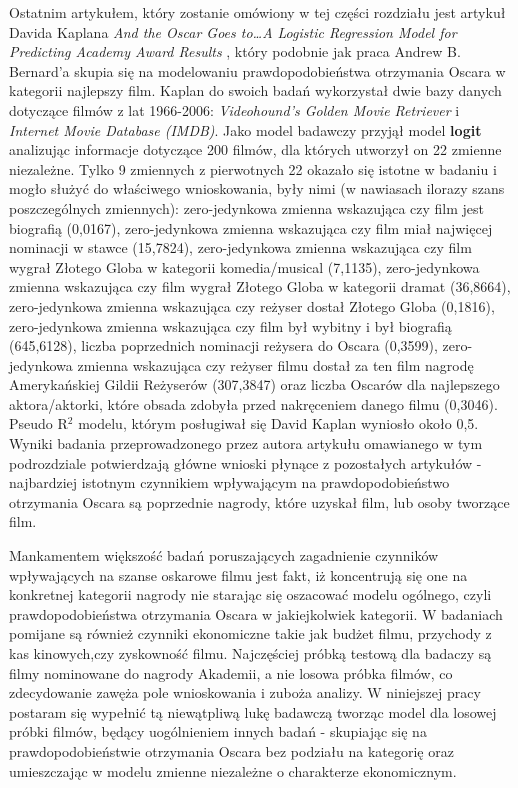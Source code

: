 Ostatnim artykułem, który zostanie omówiony w tej części rozdziału jest artykuł Davida Kaplana \textit{And the Oscar Goes to…A Logistic Regression Model for Predicting Academy Award Results} \cite{kaplan06}, który podobnie jak praca Andrew B. Bernard'a skupia się na modelowaniu prawdopodobieństwa otrzymania Oscara w kategorii najlepszy film. Kaplan do swoich badań wykorzystał dwie bazy danych dotyczące filmów z lat 1966-2006: \textit{Videohound’s Golden Movie Retriever} i \textit{Internet Movie Database (IMDB)}. Jako model badawczy przyjął model \textbf{logit} analizując informacje dotyczące 200 filmów, dla których utworzył on 22 zmienne niezależne. Tylko 9 zmiennych z pierwotnych 22 okazało się istotne w badaniu i mogło służyć do właściwego wnioskowania, były nimi (w nawiasach ilorazy szans poszczególnych zmiennych): zero-jedynkowa zmienna wskazująca czy film jest biografią (0,0167), zero-jedynkowa zmienna wskazująca czy film miał najwięcej nominacji w stawce (15,7824), zero-jedynkowa zmienna wskazująca czy film wygrał Złotego Globa w kategorii komedia/musical (7,1135), zero-jedynkowa zmienna wskazująca czy film wygrał Złotego Globa w kategorii dramat (36,8664), zero-jedynkowa zmienna wskazująca czy reżyser dostał Złotego Globa (0,1816), zero-jedynkowa zmienna wskazująca czy film był wybitny i był biografią (645,6128), liczba poprzednich nominacji reżysera do Oscara (0,3599), zero-jedynkowa zmienna wskazująca czy reżyser filmu dostał za ten film nagrodę Amerykańskiej Gildii Reżyserów (307,3847) oraz liczba Oscarów dla najlepszego aktora/aktorki, które obsada zdobyła przed nakręceniem danego filmu (0,3046). Pseudo R$^2$ modelu, którym posługiwał się David Kaplan wyniosło około 0,5. Wyniki badania przeprowadzonego przez autora artykułu omawianego w tym podrozdziale potwierdzają główne wnioski płynące z pozostałych artykułów - najbardziej istotnym czynnikiem wpływającym na prawdopodobieństwo otrzymania Oscara są poprzednie nagrody, które uzyskał film, lub osoby tworzące film. 

Mankamentem większość badań poruszających zagadnienie czynników wpływających na szanse oskarowe filmu jest fakt, iż koncentrują się one na konkretnej kategorii nagrody nie starając się oszacować modelu ogólnego, czyli prawdopodobieństwa otrzymania Oscara w jakiejkolwiek kategorii. W badaniach pomijane są również czynniki ekonomiczne takie jak budżet filmu, przychody z kas kinowych,czy zyskowność filmu. Najczęściej próbką testową dla badaczy są filmy nominowane do nagrody Akademii, a nie losowa próbka filmów, co zdecydowanie zawęża pole wnioskowania i zuboża analizy. W niniejszej pracy postaram się wypełnić tą niewątpliwą lukę badawczą tworząc model dla losowej próbki filmów, będący uogólnieniem innych badań - skupiając się na prawdopodobieństwie otrzymania Oscara bez podziału na kategorię oraz umieszczając w modelu zmienne niezależne o charakterze ekonomicznym.
 
